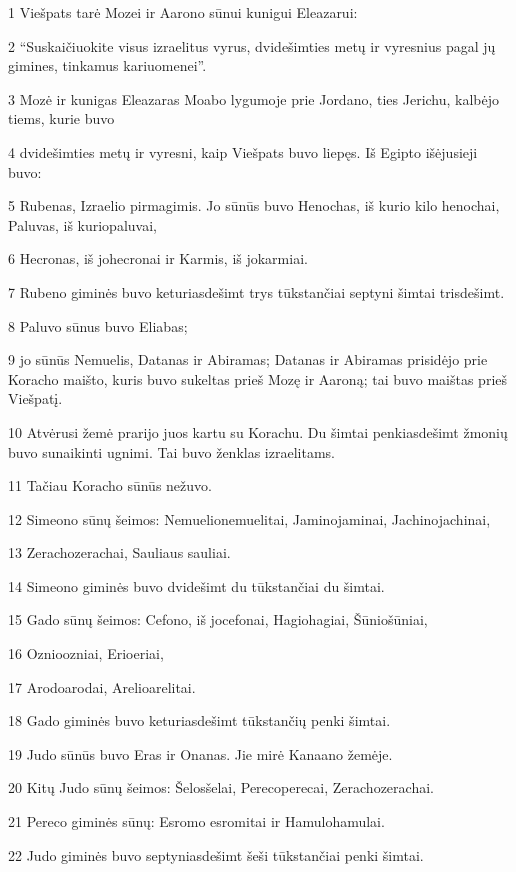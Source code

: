 \par 1 Viešpats tarė Mozei ir Aarono sūnui kunigui Eleazarui: 
\par 2 “Suskaičiuokite visus izraelitus vyrus, dvidešimties metų ir vyresnius pagal jų gimines, tinkamus kariuomenei”. 
\par 3 Mozė ir kunigas Eleazaras Moabo lygumoje prie Jordano, ties Jerichu, kalbėjo tiems, kurie buvo 
\par 4 dvidešimties metų ir vyresni, kaip Viešpats buvo liepęs. Iš Egipto išėjusieji buvo: 
\par 5 Rubenas, Izraelio pirmagimis. Jo sūnūs buvo Henochas, iš kurio kilo henochai, Paluvas, iš kurio­paluvai, 
\par 6 Hecronas, iš jo­hecronai ir Karmis, iš jo­karmiai. 
\par 7 Rubeno giminės buvo keturiasdešimt trys tūkstančiai septyni šimtai trisdešimt. 
\par 8 Paluvo sūnus buvo Eliabas; 
\par 9 jo sūnūs Nemuelis, Datanas ir Abiramas; Datanas ir Abiramas prisidėjo prie Koracho maišto, kuris buvo sukeltas prieš Mozę ir Aaroną; tai buvo maištas prieš Viešpatį. 
\par 10 Atvėrusi žemė prarijo juos kartu su Korachu. Du šimtai penkiasdešimt žmonių buvo sunaikinti ugnimi. Tai buvo ženklas izraelitams. 
\par 11 Tačiau Koracho sūnūs nežuvo. 
\par 12 Simeono sūnų šeimos: Nemuelio­nemuelitai, Jamino­jaminai, Jachino­jachinai, 
\par 13 Zeracho­zerachai, Sauliaus­ sauliai. 
\par 14 Simeono giminės buvo dvidešimt du tūkstančiai du šimtai. 
\par 15 Gado sūnų šeimos: Cefono, iš jo­cefonai, Hagio­hagiai, Šūnio­šūniai, 
\par 16 Oznio­ozniai, Erio­eriai, 
\par 17 Arodo­arodai, Arelio­arelitai. 
\par 18 Gado giminės buvo keturiasdešimt tūkstančių penki šimtai. 
\par 19 Judo sūnūs buvo Eras ir Onanas. Jie mirė Kanaano žemėje. 
\par 20 Kitų Judo sūnų šeimos: Šelos­šelai, Pereco­perecai, Zeracho­zerachai. 
\par 21 Pereco giminės sūnų: Esromo­ esromitai ir Hamulo­hamulai. 
\par 22 Judo giminės buvo septyniasdešimt šeši tūkstančiai penki šimtai. 
